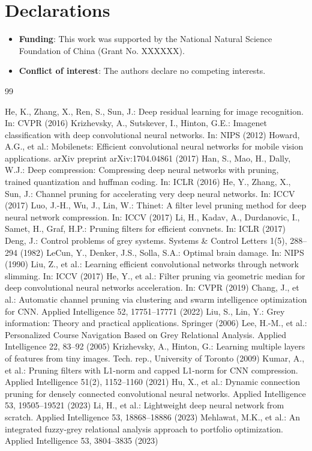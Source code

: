 \documentclass[sn-mathphys,Numbered]{sn-jnl}
\theoremstyle{thmstyleone}%
\theoremstyle{thmstyletwo}%
\theoremstyle{thmstylethree}%
\begin{document}
\section*{Declarations}
\begin{itemize}
\item \textbf{Funding}: This work was supported by the National Natural Science Foundation of China (Grant No. XXXXXX).
\item \textbf{Conflict of interest}: The authors declare no competing interests.
\end{itemize}

\begin{thebibliography}{99}

 He, K., Zhang, X., Ren, S., Sun, J.: Deep residual learning for image recognition. In: CVPR (2016)
 Krizhevsky, A., Sutskever, I., Hinton, G.E.: Imagenet classification with deep convolutional neural networks. In: NIPS (2012)
 Howard, A.G., et al.: Mobilenets: Efficient convolutional neural networks for mobile vision applications. arXiv preprint arXiv:1704.04861 (2017)
 Han, S., Mao, H., Dally, W.J.: Deep compression: Compressing deep neural networks with pruning, trained quantization and huffman coding. In: ICLR (2016)
 He, Y., Zhang, X., Sun, J.: Channel pruning for accelerating very deep neural networks. In: ICCV (2017)
 Luo, J.-H., Wu, J., Lin, W.: Thinet: A filter level pruning method for deep neural network compression. In: ICCV (2017)
 Li, H., Kadav, A., Durdanovic, I., Samet, H., Graf, H.P.: Pruning filters for efficient convnets. In: ICLR (2017)
 Deng, J.: Control problems of grey systems. Systems \& Control Letters 1(5), 288--294 (1982)
 LeCun, Y., Denker, J.S., Solla, S.A.: Optimal brain damage. In: NIPS (1990)
 Liu, Z., et al.: Learning efficient convolutional networks through network slimming. In: ICCV (2017)
 He, Y., et al.: Filter pruning via geometric median for deep convolutional neural networks acceleration. In: CVPR (2019)
 Chang, J., et al.: Automatic channel pruning via clustering and swarm intelligence optimization for CNN. Applied Intelligence 52, 17751–17771 (2022)
 Liu, S., Lin, Y.: Grey information: Theory and practical applications. Springer (2006)
 Lee, H.-M., et al.: Personalized Course Navigation Based on Grey Relational Analysis. Applied Intelligence 22, 83–92 (2005)
 Krizhevsky, A., Hinton, G.: Learning multiple layers of features from tiny images. Tech. rep., University of Toronto (2009)
 Kumar, A., et al.: Pruning filters with L1-norm and capped L1-norm for CNN compression. Applied Intelligence 51(2), 1152--1160 (2021)
 Hu, X., et al.: Dynamic connection pruning for densely connected convolutional neural networks. Applied Intelligence 53, 19505--19521 (2023)
 Li, H., et al.: Lightweight deep neural network from scratch. Applied Intelligence 53, 18868--18886 (2023)
 Mehlawat, M.K., et al.: An integrated fuzzy-grey relational analysis approach to portfolio optimization. Applied Intelligence 53, 3804--3835 (2023)

\end{thebibliography}
\end{document}
